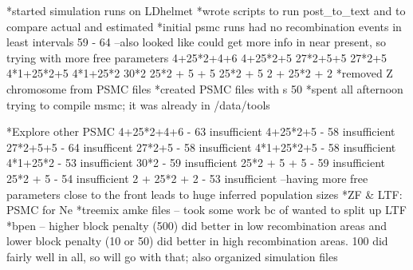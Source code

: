 \documentclass[idxtotoc,hyperref,openany,oneside]{labbook} %
\begin{document}
*started simulation runs on LDhelmet
*wrote scripts to run post_to_text and to compare actual and estimated
*initial psmc runs had no recombination events in least intervals 59 - 64
--also looked like could get more info in near present, so trying with more free parameters
4+25*2+4+6 
4+25*2+5 
27*2+5+5 
27*2+5 
4*1+25*2+5 
4*1+25*2 
30*2 
25*2 + 5 + 5 
25*2 + 5 
2 + 25*2 + 2 
*removed Z chromosome from PSMC files
*created PSMC files with s 50
*spent all afternoon trying to compile msmc; it was already in /data/tools

*Explore other PSMC
4+25*2+4+6 - 63 insufficient
4+25*2+5 - 58 insufficient
27*2+5+5 - 64 insufficent
27*2+5 - 58 insufficient
4*1+25*2+5 - 58 insufficient
4*1+25*2 - 53 insufficient
30*2 - 59 insufficient
25*2 + 5 + 5 - 59 insufficient
25*2 + 5  - 54 insufficient
2 + 25*2 + 2 - 53 insufficient
--having more free parameters close to the front leads to huge inferred population sizes
*ZF & LTF: PSMC for Ne
*treemix amke files -- took some work bc of wanted to split up LTF
*bpen -- higher block penalty (500) did better in low recombination areas and lower block penalty (10 or 50) did better in high recombination areas. 100 did fairly well in all, so will go with that; also organized simulation files
\end{document}
